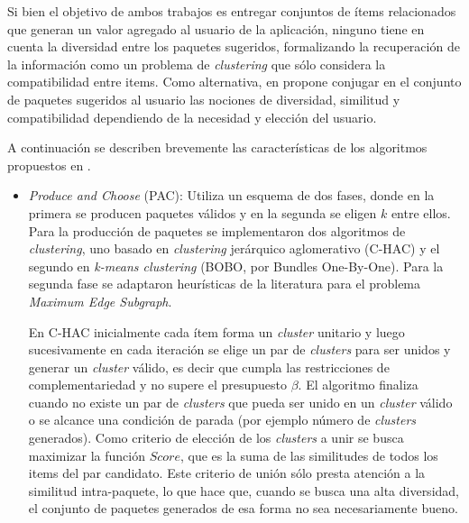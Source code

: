 Si bien el objetivo de ambos trabajos es entregar conjuntos de ítems relacionados que generan un valor agregado al usuario de la aplicación, ninguno tiene en cuenta la diversidad entre los paquetes sugeridos, formalizando la recuperación de la información como un problema de {\em clustering} que sólo considera la compatibilidad entre items. Como alternativa, en \cite{compositeRetrival} propone conjugar en el conjunto de paquetes sugeridos al usuario las nociones de diversidad, similitud y compatibilidad dependiendo de la necesidad y elección del usuario.

A continuación se describen brevemente las características de los algoritmos propuestos en \cite{compositeRetrival}.

\begin{itemize}

\item {\em Produce and Choose} (PAC): Utiliza un esquema de dos fases, donde en la primera se producen paquetes válidos y en la segunda se eligen $k$ entre ellos. Para la producción de paquetes se implementaron dos algoritmos de {\em clustering}, uno basado en {\em clustering} jerárquico aglomerativo (C-HAC) y el segundo en {\em k-means clustering} (BOBO, por Bundles One-By-One). Para la segunda fase se adaptaron heurísticas de la literatura para el problema {\em Maximum Edge Subgraph}.

En C-HAC inicialmente cada ítem forma un {\em cluster} unitario y luego sucesivamente en cada iteración se elige un par de {\em clusters} para ser unidos y generar un {\em cluster} válido, es decir que cumpla las restricciones de complementariedad y no supere el presupuesto $\beta$. El algoritmo finaliza cuando no existe un par de {\em clusters} que pueda ser unido en un {\em cluster} válido o se alcance una condición de parada (por ejemplo número de {\em clusters} generados). Como criterio de elección de los {\em clusters} a unir se busca maximizar la función $Score$, que es la suma de las similitudes de todos los items del par candidato. Este criterio de unión sólo presta atención a la similitud intra-paquete, lo que hace que, cuando se busca una alta diversidad, el conjunto de paquetes generados de esa forma no sea necesariamente bueno.


\end{itemize}
